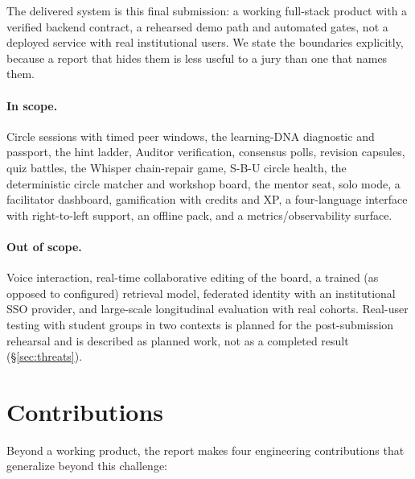 The delivered system is this final submission: a working full-stack product with a
verified backend contract, a rehearsed demo path and automated gates, not a deployed
service with real institutional users. We state the boundaries explicitly, because a
report that hides them is less useful to a jury than one that names them.

\paragraph{In scope.} Circle sessions with timed peer windows, the learning-DNA
diagnostic and passport, the hint ladder, Auditor verification, consensus polls,
revision capsules, quiz battles, the Whisper chain-repair game, S-B-U circle health,
the deterministic circle matcher and workshop board, the mentor seat, solo mode, a
facilitator dashboard, gamification with credits and XP, a four-language interface with
right-to-left support, an offline pack, and a metrics/observability surface.

\paragraph{Out of scope.} Voice interaction, real-time collaborative editing
of the board, a trained (as opposed to configured) retrieval model, federated identity
with an institutional SSO provider, and large-scale longitudinal evaluation with real
cohorts. Real-user testing with student groups in two contexts is planned for the
post-submission rehearsal and is described as planned work, not as a completed result
(\S\ref{sec:threats}).

\section{Contributions}

Beyond a working product, the report makes four engineering contributions that
generalize beyond this challenge:

